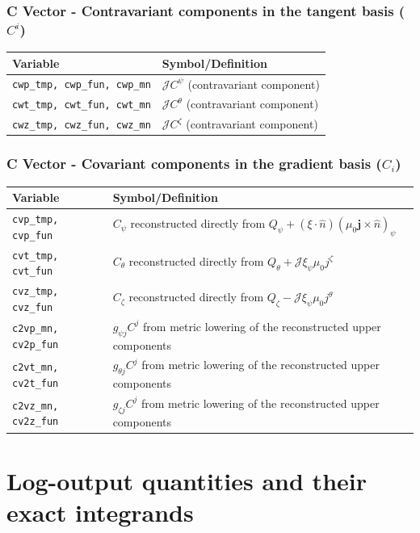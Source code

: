 \documentclass[10pt,a4paper]{article}
\numberwithin{equation}{section}
\begin{document}
\subsubsection*{C Vector - Contravariant components in the tangent basis ($C^i$)}
\begin{table}[h!]
\centering
\begin{tabular}{|l|l|}
\hline
\textbf{Variable} & \textbf{Symbol/Definition} \\
\hline
\texttt{cwp\_tmp, cwp\_fun, cwp\_mn} & $\mathcal{J}C^\psi$ (contravariant component) \\
\texttt{cwt\_tmp, cwt\_fun, cwt\_mn} & $\mathcal{J}C^\theta$ (contravariant component) \\
\texttt{cwz\_tmp, cwz\_fun, cwz\_mn} & $\mathcal{J}C^\zeta$ (contravariant component) \\
\hline
\end{tabular}
\end{table}

\subsubsection*{C Vector - Covariant components in the gradient basis ($C_i$)}
\begin{table}[h!]
\centering
\begin{tabular}{|l|l|}
\hline
\textbf{Variable} & \textbf{Symbol/Definition} \\
\hline
\texttt{cvp\_tmp, cvp\_fun} & $C_\psi$ reconstructed directly from $Q_\psi+(\xi\cdot\hat n)(\mu_0\mathbf j\times\hat n)_\psi$ \\
\texttt{cvt\_tmp, cvt\_fun} & $C_\theta$ reconstructed directly from $Q_\theta+\mathcal J\xi_\psi\mu_0j^\zeta$ \\
\texttt{cvz\_tmp, cvz\_fun} & $C_\zeta$ reconstructed directly from $Q_\zeta-\mathcal J\xi_\psi\mu_0j^\theta$ \\
\texttt{c2vp\_mn, cv2p\_fun} & $g_{\psi j}C^j$ from metric lowering of the reconstructed upper components \\
\texttt{c2vt\_mn, cv2t\_fun} & $g_{\theta j}C^j$ from metric lowering of the reconstructed upper components \\
\texttt{c2vz\_mn, cv2z\_fun} & $g_{\zeta j}C^j$ from metric lowering of the reconstructed upper components \\
\hline
\end{tabular}
\end{table}

\section{Log-output quantities and their exact integrands}
\label{sec:logmap}
\end{document}
